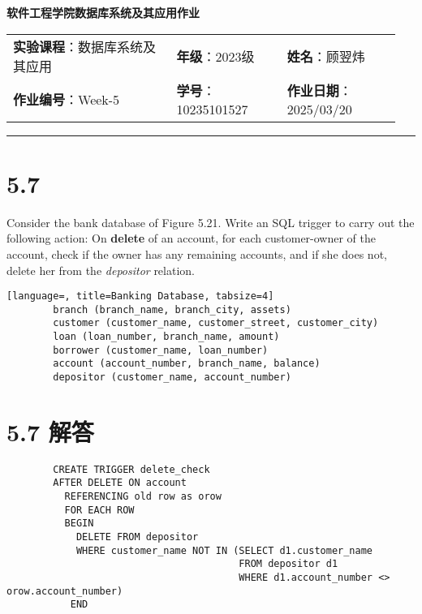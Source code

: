 \documentclass{article}
\begin{document}
	
	\begin{center}
		{\Large{\textbf{\heiti 软件工程学院数据库系统及其应用作业}}}
		\begin{table}[htb]
			\flushleft
			\begin{tabular}{p{0.4\linewidth}p{0.27\linewidth}p{0.28\linewidth}}\\
				\textbf{实验课程}：数据库系统及其应用  & \textbf{年级}：2023级       & \textbf{姓名}：顾翌炜  \\
				\textbf{作业编号}：Week-5    & \textbf{学号}：10235101527 & \textbf{作业日期}：2025/03/20  \\
			\end{tabular}
		\end{table}
	\end{center}
	\rule{\textwidth}{2pt}
	
	\setlength{\parindent}{2em}
	
	\section*{5.7}
	
	Consider the bank database of Figure 5.21. Write an SQL trigger to carry out the following action: On \textbf{delete} of an account, for each customer-owner of the account, check if the owner has any remaining accounts, and if she does not, delete her from the \textit{depositor} relation.
	
	\begin{lstlisting}[language=, title=Banking Database, tabsize=4]
		branch (branch_name, branch_city, assets)
		customer (customer_name, customer_street, customer_city)
		loan (loan_number, branch_name, amount)
		borrower (customer_name, loan_number)
		account (account_number, branch_name, balance)
		depositor (customer_name, account_number)
	\end{lstlisting}
	
	\section*{5.7 解答}
	
	\begin{verbatim}
		CREATE TRIGGER delete_check
		AFTER DELETE ON account
		  REFERENCING old row as orow
		  FOR EACH ROW
		  BEGIN
		    DELETE FROM depositor
		    WHERE customer_name NOT IN (SELECT d1.customer_name
		                                FROM depositor d1
		                                WHERE d1.account_number <> orow.account_number)
		   END
	\end{verbatim}
	
\end{document}
